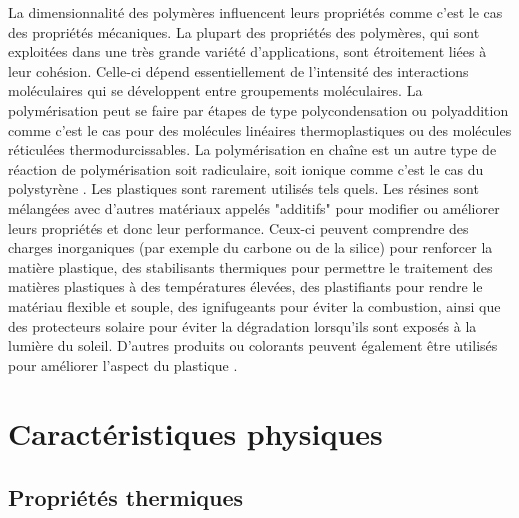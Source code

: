\par{
La dimensionnalit\'e des polym\`eres influencent leurs propri\'et\'es comme c'est le cas des propri\'et\'es m\'ecaniques. La  plupart  des  propri\'et\'es  des  polym\`eres,  qui  sont  exploit\'ees  dans  une  tr\`es  grande  vari\'et\'e d'applications,  sont  \'etroitement  li\'ees  \`a  leur  coh\'esion.  Celle-ci  d\'epend  essentiellement  de l'intensit\'e des interactions mol\'eculaires qui se d\'eveloppent entre groupements mol\'eculaires. La polym\'erisation peut se faire par \'etapes de type polycondensation ou polyaddition comme c'est le cas pour des mol\'ecules lin\'eaires thermoplastiques ou des mol\'ecules r\'eticul\'ees thermodurcissables. La polym\'erisation en cha\^ine est un autre type de r\'eaction de polym\'erisation soit radiculaire, soit ionique comme c'est le cas du polystyr\`ene {\citep{fontanille2014chimie}}. Les plastiques sont rarement utilis\'es tels quels. Les r\'esines sont m\'elang\'ees avec d'autres mat\'eriaux appel\'es "additifs" pour modifier ou am\'eliorer leurs propri\'et\'es et donc leur performance. Ceux-ci peuvent comprendre des charges inorganiques (par exemple du carbone ou de la silice) pour renforcer la mati\`ere plastique, des stabilisants thermiques pour permettre le traitement des mati\`eres plastiques \`a des temp\'eratures \'elev\'ees, des plastifiants pour rendre le mat\'eriau flexible et souple, des ignifugeants pour \'eviter la combustion, ainsi que des protecteurs solaire pour \'eviter la d\'egradation lorsqu'ils sont expos\'es \`a la lumi\`ere du soleil. D'autres produits ou colorants peuvent \'egalement \^etre utilis\'es pour am\'eliorer l'aspect du plastique {\citep{andrady2009applications}}.
}

\section{Caract\'eristiques physiques}
\subsection{Propri\'et\'es thermiques}

